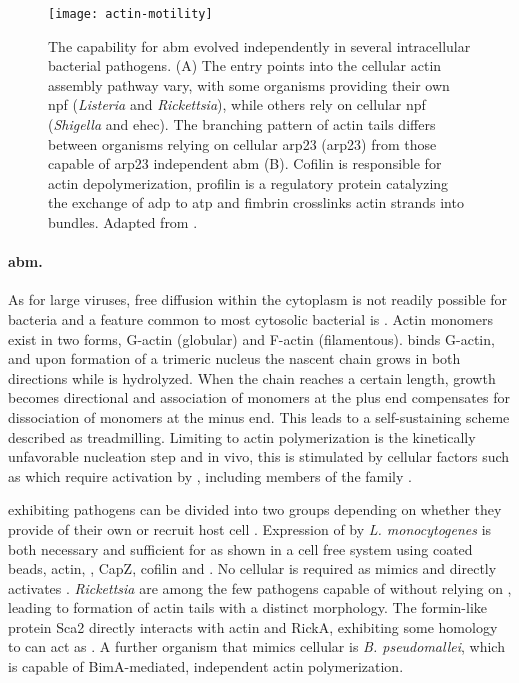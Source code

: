 \begin{figure}
  \centering
  \texttt{[image: actin-motility]}
  \caption[Mechanisms of \acrlong{abm} in several intracellular bacterial pathogens.]{The capability for \acrfull{abm} evolved independently in several intracellular bacterial pathogens. (A) The entry points into the cellular actin assembly pathway vary, with some organisms providing their own \acrfull{npf} (\textit{Listeria} and \textit{Rickettsia}), while others rely on cellular \acrshort{npf} (\textit{Shigella} and \acrlong{ehec}). The branching pattern of actin tails differs between organisms relying on cellular \acrshort{arp23} (\acrlong{arp23}) from those capable of \acrshort{arp23} independent \acrshort{abm} (B). Cofilin is responsible for actin depolymerization, profilin is a regulatory protein catalyzing the exchange of \acrshort{adp} to \acrshort{atp} and fimbrin crosslinks actin strands into bundles. Adapted from \citet{Haglund2011}.}
  \label{fig:actin-motility}
\end{figure}

\label{actin-motility}
\paragraph{\Acrfull{abm}.}
As for large viruses, free diffusion within the cytoplasm is not readily possible for bacteria and a feature common to most cytosolic bacterial is 
. Actin monomers exist in two forms, G-actin (globular) and F-actin (filamentous).  binds G-actin, and upon formation of a trimeric nucleus the nascent chain grows in both directions while  is hydrolyzed. When the chain reaches a certain length, growth becomes directional and association of monomers at the plus end compensates for dissociation of monomers at the minus end. This leads to a self-sustaining scheme described as treadmilling. Limiting to actin polymerization is the kinetically unfavorable nucleation step and in vivo, this is stimulated by cellular factors such as  which require activation by , including members of the  family \citep{Stevens2006,Haglund2011}.

 exhibiting pathogens can be divided into two groups depending on whether they provide  of their own or recruit host cell . Expression of  by \textit{L. monocytogenes} is both necessary and sufficient for  as shown in a cell free system using  coated beads, actin, , CapZ, cofilin and . No cellular  is required as  mimics  and directly activates . \textit{Rickettsia} are among the few pathogens capable of  without relying on , leading to formation of actin tails with a distinct morphology. The formin-like protein Sca2 directly interacts with actin and RickA, exhibiting some homology to  can act as . A further organism that mimics cellular  is \textit{B. pseudomallei}, which is capable of BimA-mediated,  independent actin polymerization.

